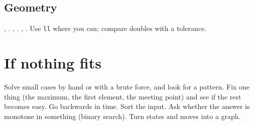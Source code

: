 \subsection{Geometry}
\begin{itemize}[leftmargin=1em, nosep]
	 , .
	 , .
	 , .
	Use \texttt{ll} where you can; compare doubles with a tolerance.
\end{itemize}

\section{If nothing fits}
Solve small cases by hand or with a brute force, and look for a pattern. Fix one thing (the maximum, the
first element, the meeting point) and see if the rest becomes easy. Go backwards in time. Sort the input.
Ask whether the answer is monotone in something (binary search). Turn states and moves into a graph.
